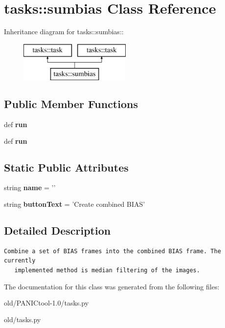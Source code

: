 \section{tasks::sumbias Class Reference}
\label{classtasks_1_1sumbias}
Inheritance diagram for tasks::sumbias::\begin{figure}[H]
\begin{center}
\leavevmode
\includegraphics[height=2cm]{classtasks_1_1sumbias}
\end{center}
\end{figure}
\subsection*{Public Member Functions}
\begin{CompactItemize}
\item 
def \textbf{run}\label{classtasks_1_1sumbias_327f40e3c4132a7e7023ad778c4fad4f}

\item 
def \textbf{run}\label{classtasks_1_1sumbias_327f40e3c4132a7e7023ad778c4fad4f}

\end{CompactItemize}
\subsection*{Static Public Attributes}
\begin{CompactItemize}
\item 
string \textbf{name} = '{\bfsumbias}'\label{classtasks_1_1sumbias_b1ea35d5272e1b4c8ca78c75707b224d}

\item 
string \textbf{button\-Text} = 'Create combined BIAS'\label{classtasks_1_1sumbias_a12ef6ed5cd1e2b23f95e6df40135e0b}

\end{CompactItemize}


\subsection{Detailed Description}


\footnotesize\begin{verbatim}Combine a set of BIAS frames into the combined BIAS frame. The currently
   implemented method is median filtering of the images.
\end{verbatim}
\normalsize
 



The documentation for this class was generated from the following files:\begin{CompactItemize}
\item 
old/PANICtool-1.0/tasks.py\item 
old/tasks.py\end{CompactItemize}
